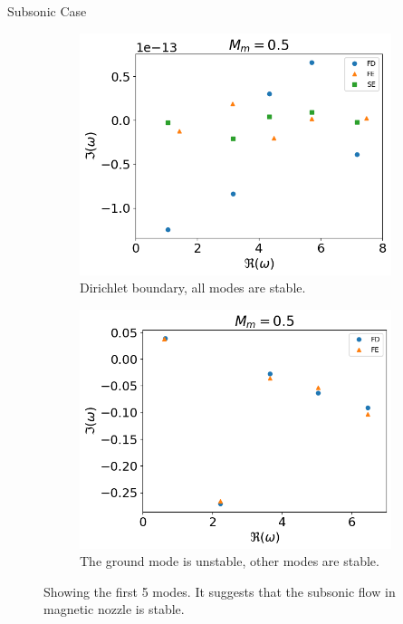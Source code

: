 \begin{frame}{Subsonic Case}
  \begin{figure} [H]
    \centering
    \begin{subfigure}{0.45\textwidth}
      \centering
      \includegraphics[width=\linewidth]{figures/numerical-experiments/fixed-fixed/subsonic-v}
      \caption{Dirichlet boundary, all modes are stable.}
    \end{subfigure}%
    \begin{subfigure}{0.45\textwidth}
      \includegraphics[width=\linewidth]{figures/numerical-experiments/fixed-open/subsonic-v}
      \caption{The ground mode is unstable, other modes are stable.}
    \end{subfigure}
    \caption{Showing the first 5 modes. It suggests that the subsonic flow in magnetic nozzle is stable.}
  \end{figure}
\end{frame}

